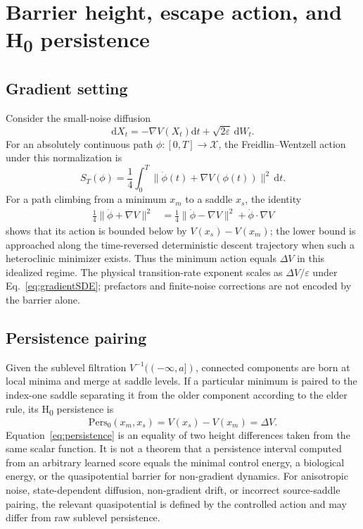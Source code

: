\documentclass[11pt]{article}
\newcommand{\D}{\mathrm{d}}
\newcommand{\grad}{\nabla}
\newcommand{\1}{\mathbf{1}}
\begin{document}
\section{Barrier height, escape action, and H\textsubscript{0} persistence}
\subsection{Gradient setting}
Consider the small-noise diffusion
\begin{equation}
\D X_t=-\grad V(X_t)\D t+\sqrt{2\varepsilon}\,\D W_t.
\label{eq:gradientSDE}
\end{equation}
For an absolutely continuous path $\phi:[0,T]\to\mathcal{X}$, the Freidlin--Wentzell action under this normalization is
\begin{equation}
S_T(\phi)=\frac14\int_0^T\|\dot\phi(t)+\grad V(\phi(t))\|^2\,\D t.
\label{eq:action}
\end{equation}
For a path climbing from a minimum $x_m$ to a saddle $x_s$, the identity
\begin{align}
\frac14\|\dot\phi+\grad V\|^2
&=\frac14\|\dot\phi-\grad V\|^2+\dot\phi\cdot\grad V
\end{align}
shows that its action is bounded below by $V(x_s)-V(x_m)$; the lower bound is approached along the time-reversed deterministic descent trajectory when such a heteroclinic minimizer exists. Thus the minimum action equals $\Delta V$ in this idealized regime. The physical transition-rate exponent scales as $\Delta V/\varepsilon$ under Eq.~\eqref{eq:gradientSDE}; prefactors and finite-noise corrections are not encoded by the barrier alone.

\subsection{Persistence pairing}
Given the sublevel filtration $V^{-1}((-\infty,a])$, connected components are born at local minima and merge at saddle levels. If a particular minimum is paired to the index-one saddle separating it from the older component according to the elder rule, its H\textsubscript{0} persistence is
\begin{equation}
\mathrm{Pers}_0(x_m,x_s)=V(x_s)-V(x_m)=\Delta V.
\label{eq:persistence}
\end{equation}
Equation~\eqref{eq:persistence} is an equality of two height differences taken from the same scalar function. It is not a theorem that a persistence interval computed from an arbitrary learned score equals the minimal control energy, a biological energy, or the quasipotential barrier for non-gradient dynamics. For anisotropic noise, state-dependent diffusion, non-gradient drift, or incorrect source-saddle pairing, the relevant quasipotential is defined by the controlled action and may differ from raw sublevel persistence.
\end{document}
